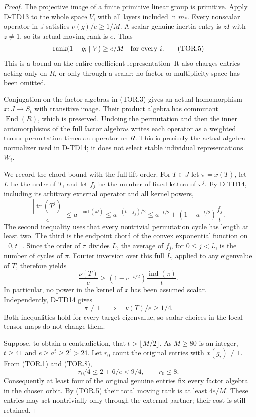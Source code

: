 \begin{proof}
The projective image of a finite primitive linear group is primitive.
Apply D-TD13 to the whole space \(V\), with all layers included in
\(m_*\). Every nonscalar operator in \(J\) satisfies
\(\nu(g)/e\ge1/M\). A scalar genuine inertia entry is \(zI\)
with \(z\ne1\), so its actual moving rank is \(e\). Thus
\[
             \operatorname{rank}(1-g_i\mid V)\ge e/M
                         \quad\hbox{for every }i.
 \tag{TOR.5}
\]
This is a bound on the entire coefficient representation. It also
charges entries acting only on \(R\), or only through a scalar;
no factor or multiplicity space has been omitted.

Conjugation on the factor algebras in (TOR.3) gives an actual
homomorphism \(x:J\to S_t\) with transitive image. Their product
algebra has commutant \(\operatorname{End}(R)\), which is preserved.
Undoing the permutation and then the inner automorphisms of the full
factor algebras writes each operator as a weighted tensor permutation
times an operator on \(R\). This is precisely the actual algebra
normalizer used in D-TD14; it does not select stable individual
representations \(W_i\).

We record the chord bound with the full lift order. For \(T\in J\)
let \(\pi=x(T)\), let \(L\) be the order of \(T\), and let
\(f_j\) be the number of fixed letters of \(\pi^j\). By D-TD14,
including its arbitrary external operator and all kernel powers,
\[
 \frac{|\operatorname{tr}(T^j)|}{e}
 \le a^{-\operatorname{ind}(\pi^j)}
 \le a^{-(t-f_j)/2}
 \le a^{-t/2}+(1-a^{-t/2})\frac{f_j}{t}.
 \tag{TOR.6}
\]
The second inequality uses that every nontrivial permutation cycle
has length at least two. The third is the endpoint chord of the
convex exponential function on \([0,t]\). Since the order of
\(\pi\) divides \(L\), the average of \(f_j\), for
\(0\le j<L\), is the number of cycles of \(\pi\). Fourier
inversion over this full \(L\), applied to any eigenvalue of \(T\),
therefore yields
\[
 \frac{\nu(T)}e\ge
           (1-a^{-t/2})\frac{\operatorname{ind}(\pi)}{t}.
 \tag{TOR.7}
\]
In particular, no power in the kernel of \(x\) has been assumed
scalar. Independently, D-TD14 gives
\[
                 \pi\ne1\quad\Longrightarrow\quad\nu(T)/e\ge1/4.
 \tag{TOR.8}
\]
Both inequalities hold for every target eigenvalue, so scalar choices
in the local tensor maps do not change them.

Suppose, to obtain a contradiction, that \(t>\lfloor M/2\rfloor\).
As \(M\ge80\) is an integer, \(t\ge41\) and
\(e\ge a^t\ge2^t>24\). Let \(r_0\) count the original entries
with \(x(g_i)\ne1\). From (TOR.1) and (TOR.8),
\[
                         r_0/4\le2+6/e<9/4,
                         \qquad r_0\le8.
 \tag{TOR.9}
\]
Consequently at least four of the original genuine entries fix
every factor algebra in the chosen orbit. By (TOR.5) their total
moving rank is at least \(4e/M\). These entries may act nontrivially
only through the external partner; their cost is still retained.


\end{proof}
